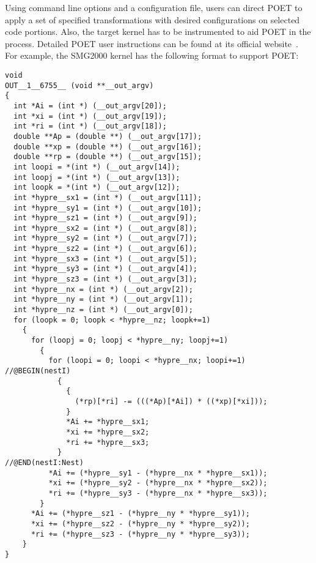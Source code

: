 Using command line options and a configuration file, users can direct POET to apply a set
of specified transformations with desired configurations on selected code portions. 
Also, the target kernel has to be instrumented to aid POET in the process. 
Detailed POET user instructions can be found at its official website~\cite{poetWeb}.
For example, the SMG2000 kernel has the following format to support
POET:
\lstset{language=C, basicstyle=\scriptsize}
\begin{lstlisting}
void
OUT__1__6755__ (void **__out_argv)
{
  int *Ai = (int *) (__out_argv[20]);
  int *xi = (int *) (__out_argv[19]);
  int *ri = (int *) (__out_argv[18]);
  double **Ap = (double **) (__out_argv[17]);
  double **xp = (double **) (__out_argv[16]);
  double **rp = (double **) (__out_argv[15]);
  int loopi = *(int *) (__out_argv[14]);
  int loopj = *(int *) (__out_argv[13]);
  int loopk = *(int *) (__out_argv[12]);
  int *hypre__sx1 = (int *) (__out_argv[11]);
  int *hypre__sy1 = (int *) (__out_argv[10]);
  int *hypre__sz1 = (int *) (__out_argv[9]);
  int *hypre__sx2 = (int *) (__out_argv[8]);
  int *hypre__sy2 = (int *) (__out_argv[7]);
  int *hypre__sz2 = (int *) (__out_argv[6]);
  int *hypre__sx3 = (int *) (__out_argv[5]);
  int *hypre__sy3 = (int *) (__out_argv[4]);
  int *hypre__sz3 = (int *) (__out_argv[3]);
  int *hypre__nx = (int *) (__out_argv[2]);
  int *hypre__ny = (int *) (__out_argv[1]);
  int *hypre__nz = (int *) (__out_argv[0]);
  for (loopk = 0; loopk < *hypre__nz; loopk+=1)
    {
      for (loopj = 0; loopj < *hypre__ny; loopj+=1)
        {
          for (loopi = 0; loopi < *hypre__nx; loopi+=1) //@BEGIN(nestI)
            {
              {
                (*rp)[*ri] -= (((*Ap)[*Ai]) * ((*xp)[*xi]));
              }
              *Ai += *hypre__sx1;
              *xi += *hypre__sx2;
              *ri += *hypre__sx3;
            }                                               //@END(nestI:Nest)
          *Ai += (*hypre__sy1 - (*hypre__nx * *hypre__sx1));
          *xi += (*hypre__sy2 - (*hypre__nx * *hypre__sx2));
          *ri += (*hypre__sy3 - (*hypre__nx * *hypre__sx3));
        }
      *Ai += (*hypre__sz1 - (*hypre__ny * *hypre__sy1));
      *xi += (*hypre__sz2 - (*hypre__ny * *hypre__sy2));
      *ri += (*hypre__sz3 - (*hypre__ny * *hypre__sy3));
    }
}
\end{lstlisting}


